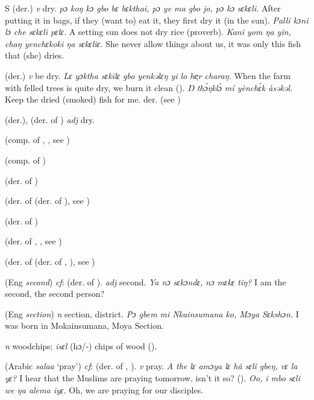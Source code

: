 \begin{letter}{S}
 (der.) \textit{v} dry. \textit{pɔ koŋ kɔ gbo bɛ bɛkthai, pɔ ye ma gbo jo, pɔ kɔ sɛkɛli.} After putting it in bags, if they (want to) eat it, they first dry it (in the sun). \textit{Palli kɔni lɔ che sɛkɛli pɛlɛ.} A setting sun does not dry rice (proverb). \textit{Kani yom ŋa yin, chaŋ yenchɛkoki ŋa sɛkɛliɛ.} She never allow things about us, it was only this fish that (she) dries.

 (der.) \textit{v} be dry. \textit{Lɛ yɔktha sɛkilɛ gbo yenkəlɛŋ yi lo he̹r charaŋ.} When the farm with felled trees is quite dry, we burn it clean (\citealt{Pichl1967}). \textit{Ŋ thɔ́ŋklɔ̀ mí yènchɛ́k àsəkəl.} Keep the dried (smoked) fish for me. der.  (see )

 (der.), (der. of ) \textit{adj} dry.

 (comp. of , , see ) 

 (comp. of ) 

 (der. of )

 (der. of  (der. of ), see ) 

 (der. of ) 

 (der. of , , see ) 

 (der. of  (der. of , ), see ) 


 (Eng \textit{second}) \textit{cf}:  (der. of ). \textit{adj} second. \textit{Ya nɔ sɛkɔndɛ, nɔ mɛkɛ tiŋ?} I am the second, the second person?

 (Eng \textit{section}) \textit{n} section, district. \textit{Pɔ gbem mi Nkainsumana ko, Mɔya Sɛkshɔn.} I was born in Mokainsumana, Moya Section.

 \textit{n} woodchips; \textit{isɛl} (hɔ/-) chips of wood (\citealt{Pichl1967}). 

 (Arabic { } \textit{salaa} ‘pray') \textit{cf}:  (der. of , ). \textit{v} pray. \textit{A the lɛ amɔya lɛ hã sɛli gbeŋ, vɛ la yɛ? }I hear that the Muslims are praying tomorrow, isn't it so? (\citealt{Pichl1967}). \textit{Oo, i mbo sɛli we ŋa alema iyɛ.} Oh, we are praying for our disciples.


\end{letter}
